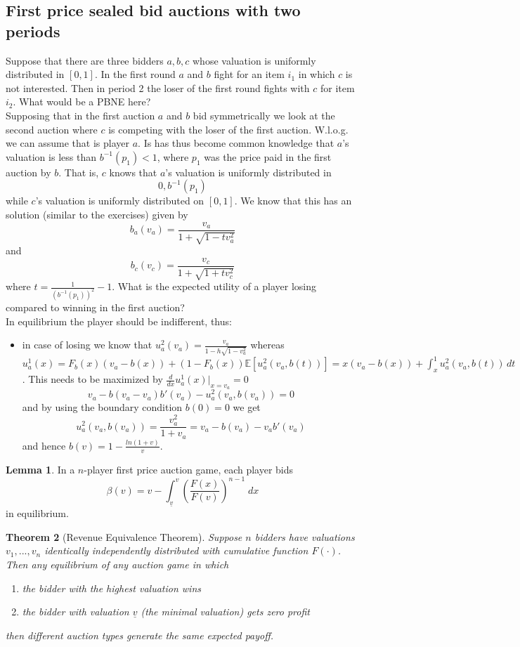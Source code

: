 \documentclass[a4paper, 12pt]{article}
\theoremstyle{plain}
\newtheorem{theorem}{Theorem}[subsection] %
\theoremstyle{definition}
\theoremstyle{lemma}
\newtheorem{lemma}[theorem]{Lemma}
\theoremstyle{remark}
\theoremstyle{corollary}
\theoremstyle{example}
\begin{document}
	\subsection{First price sealed bid auctions with two periods}
	Suppose that there are three bidders $a,b,c$ whose valuation is uniformly distributed in $[0,1]$. In the first round $a$ and $b$ fight for an item $i_1$ in which $c$ is not interested. Then in period 2 the loser of the first round fights with $c$ for item $i_2$. What would be a PBNE here?\\
	Supposing that in the first auction $a$ and $b$ bid symmetrically we look at the second auction where $c$ is competing with the loser of the first auction. W.l.o.g. we can assume that is player $a$. Is has thus become common knowledge that $a$'s valuation is less than $b^{-1}(p_1)<1$, where $p_1$ was the price paid in the first auction by $b$. That is, $c$ knows that $a$'s valuation is uniformly distributed in \[0,b^{-1}(p_1)\] while $c$'s valuation is uniformly distributed on $[0,1]$. We know that this has an solution (similar to the exercises) given by \[b_a(v_a) = \frac{v_a}{1+\sqrt{1-tv_a^2}}\] and \[b_c(v_c) = \frac{v_c}{1+\sqrt{1+tv_c^2}}\] where $t = \frac{1}{(b^{-1}(p_1))^2}-1$.
	What is the expected utility of a player losing compared to winning in the first auction?\\
	In equilibrium the player should be indifferent, thus: \begin{itemize}
		\item in case of losing we know that $u_a^2(v_a) = \frac{v_a}{1-h\sqrt{1-v_a^2}}$ whereas $u_a^1(x) = F_b(x)(v_a-b(x)) + (1-F_b(x))\mathbb{E}[u_a^2(v_a,b(t))] = x(v_a-b(x)) + \int_{x}^{1} u_a^2(v_a,b(t))\,dt$. This needs to be maximized by $\frac{d}{dx}u_a^1(x)|_{x=v_a} = 0$ \[v_a - b(v_a-v_a)b'(v_a) - u_a^2(v_a,b(v_a)) = 0\] and by using the boundary condition $b(0) = 0$ we get \[u_a^2(v_a,b(v_a)) = \frac{v_a^2}{1+v_a} = v_a-b(v_a)-v_a b'(v_a)\] and hence $b(v) = 1-\frac{ln(1+v)}{v}$.
	\end{itemize}
	\begin{lemma}
		In a $n$-player first price auction game, each player bids \[\beta(v) = v- \int_{\underline{v}}^{v}\left(\frac{F(x)}{F(v)}\right)^{n-1} \; dx\] in equilibrium.
	\end{lemma}
	\begin{theorem}[Revenue Equivalence Theorem]
		Suppose $n$ bidders have valuations $v_1,...,v_n$ identically independently distributed with cumulative function $F(\cdot)$. Then any equilibrium of any auction game in which \begin{enumerate}
			\item the bidder with the highest valuation wins
			\item the bidder with valuation $\underline{v}$ (the minimal valuation) gets zero profit
		\end{enumerate}
		then different auction types generate the same expected payoff.
	\end{theorem}
\end{document}
